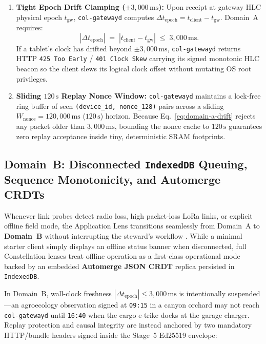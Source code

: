 \begin{enumerate}
  \item \textbf{Tight Epoch Drift Clamping ($\pm 3{,}000\,\mathrm{ms}$):} Upon receipt at gateway HLC physical epoch $t_{\mathrm{gw}}$, \texttt{col-gatewayd} computes $\Delta t_{\mathrm{epoch}} = t_{\mathrm{client}} - t_{\mathrm{gw}}$. Domain~A requires:
  \begin{equation}
  \label{eq:domain-a-drift}
  |\Delta t_{\mathrm{epoch}}| \;=\; |t_{\mathrm{client}} - t_{\mathrm{gw}}| \;\le\; 3{,}000\,\mathrm{ms}.
  \end{equation}
  If a tablet's clock has drifted beyond $\pm 3{,}000\,\mathrm{ms}$, \texttt{col-gatewayd} returns HTTP \texttt{425 Too Early} / \texttt{401 Clock Skew} carrying its signed monotonic HLC beacon so the client slews its logical clock offset without mutating OS root privileges.
  \item \textbf{Sliding $120\,\mathrm{s}$ Replay Nonce Window:} \texttt{col-gatewayd} maintains a lock-free ring buffer of seen \texttt{(device\_id, nonce\_128)} pairs across a sliding $W_{\mathrm{nonce}} = 120{,}000\,\mathrm{ms}$ ($120\,\mathrm{s}$) horizon. Because Eq.~\eqref{eq:domain-a-drift} rejects any packet older than $3{,}000\,\mathrm{ms}$, bounding the nonce cache to $120\,\mathrm{s}$ guarantees zero replay acceptance inside tiny, deterministic SRAM footprints.
\end{enumerate}

\subsection{Domain~B: Disconnected \texttt{IndexedDB} Queuing, Sequence Monotonicity, and Automerge CRDTs}
\label{subsec:domain-b}

Whenever link probes detect radio loss, high packet-loss LoRa links, or explicit offline field mode, the Application Lens transitions seamlessly from Domain~A to \textbf{Domain~B} without interrupting the steward's workflow \parencite{kleppmann2019localfirst}. While a minimal starter client simply displays an offline status banner when disconnected, full Constellation lenses treat offline operation as a first-class operational mode backed by an embedded \textbf{Automerge JSON CRDT} replica \parencite{kleppmann2017automerge,shapiro2011crdt} persisted in \texttt{IndexedDB}.

In Domain~B, wall-clock freshness $|\Delta t_{\mathrm{epoch}}| \le 3{,}000\,\mathrm{ms}$ is intentionally suspended---an agroecology observation signed at \texttt{09:15} in a canyon orchard may not reach \texttt{col-gatewayd} until \texttt{16:40} when the cargo e-trike docks at the garage charger. Replay protection and causal integrity are instead anchored by two mandatory HTTP/bundle headers signed inside the Stage~5 Ed25519 envelope:

